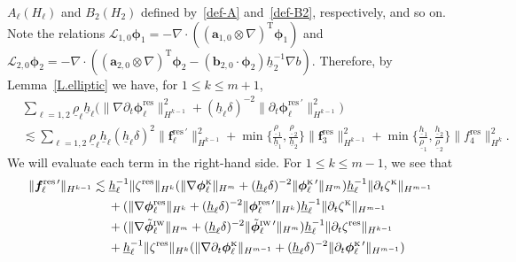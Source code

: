 \documentclass[11pt,leqno]{article}
\numberwithin{equation}{section}
\numberwithin{figure}{section}
\begin{document}
$A_\ell(H_\ell)$ and $B_2(H_2)$ defined by~\eqref{def-A} and~\eqref{def-B2}, respectively, and so on.
Note the relations $\mathcal{L}_{1,0}\bm{\phi}_1=-\nabla\cdot((\bm{a}_{1,0}\otimes\nabla)^\mathrm{T}\bm{\phi}_1)$ 
and $\mathcal{L}_{2,0}\bm{\phi}_2=-\nabla\cdot((\bm{a}_{2,0}\otimes\nabla)^\mathrm{T}\bm{\phi}_2
-(\bm{b}_{2,0}\cdot\bm{\phi}_2)\underline{h}_2^{-1}\nabla b)$. 
Therefore, by Lemma~\ref{L.elliptic} we have, for $1\leq k\leq m+1$, 
%
\begin{align*}
& \sum_{\ell=1,2}\underline{\rho}_\ell \underline{h}_\ell \bigl(
 \|\nabla\partial_t\bm{\phi}_\ell^\mathrm{res}\|_{H^{k-1}}^2
  + (\underline{h}_\ell\delta)^{-2}\|\partial_t\bm{\phi}_\ell^{\mathrm{res}\,\prime}\|_{H^{k-1}}^2 \bigr) \\
&\lesssim  \sum_{\ell=1,2}\underline{\rho}_\ell \underline{h}_\ell
  (\underline{h}_\ell\delta)^2 \|\bm{f}_\ell^{\mathrm{res} \, \prime}\|_{H^{k-1}}^2 
 + \min\biggl\{\frac{\underline{\rho}_1}{\underline{h}_1},\frac{\underline{\rho}_2}{\underline{h}_2} \biggr\}
  \|\bm{f}_3^\mathrm{res}\|_{H^{k-1}}^2
 + \min\biggl\{\frac{\underline{h}_1}{\underline{\rho}_1},\frac{\underline{h}_2}{\underline{\rho}_2} \biggr\}
  \|f_4^\mathrm{res}\|_{H^k}^2.
\end{align*}
%
We will evaluate each term in the right-hand side. 
For $1\leq k\leq m-1$, we see that
%
\begin{align*}
\|\bm{f}_\ell^{\mathrm{res} \, \prime}\|_{H^{k-1}}
&\lesssim  \underline{h}_\ell^{-1}\|\zeta^\mathrm{res}\|_{H^{k}} ( \|\nabla\bm{\phi}_\ell^{\mbox{\rm\tiny K}}\|_{H^m}
 + (\underline{h}_\ell\delta)^{-2}\|\bm{\phi}_\ell^{\mbox{\rm\tiny K} \, \prime}\|_{H^m} )
  \underline{h}_\ell^{-1}\|\partial_t\zeta^{\mbox{\rm\tiny K}}\|_{H^{m-1}} \\
&\quad\;
 + ( \|\nabla\bm{\phi}_\ell^\mathrm{res}\|_{H^k}
  + (\underline{h}_\ell\delta)^{-2}\|\bm{\phi}_\ell^{\mathrm{res} \, \prime}\|_{H^k} )
  \underline{h}_\ell^{-1}\|\partial_t\zeta^{\mbox{\rm\tiny K}}\|_{H^{m-1}} \\
&\quad\; 
 + ( \|\nabla\tilde{\bm{\phi}}_\ell^{\mbox{\rm\tiny IW}}\|_{H^m}
  + (\underline{h}_\ell\delta)^{-2}\|\tilde{\bm{\phi}}_\ell^{\mbox{\rm\tiny IW} \, \prime}\|_{H^m} )
  \underline{h}_\ell^{-1}\|\partial_t\zeta^\mathrm{res}\|_{H^{k-1}}\\
&\quad\; 
 + \underline{h}_\ell^{-1}\|\zeta^\mathrm{res}\|_{H^{k}}( \|\nabla\partial_t{\bm{\phi}}_\ell^{\mbox{\rm\tiny K}}\|_{H^{m-1}}
  + (\underline{h}_\ell\delta)^{-2}\|\partial_t{\bm{\phi}}_\ell^{\mbox{\rm\tiny K} \, \prime}\|_{H^{m-1}} ) 
\end{align*}
\end{document}
